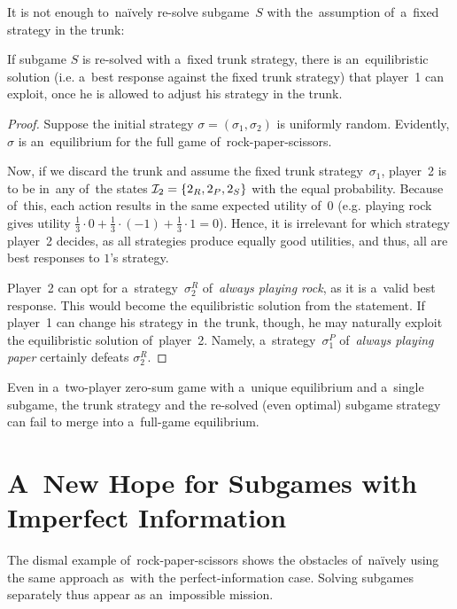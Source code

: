 It is not enough to~na{\"i}vely re-solve subgame~$S$ with the~assumption of~a~fixed strategy in the trunk:
\begin{claim}
  \label{claim:rps-subgame}
  If subgame $S$ is re-solved with a~fixed trunk strategy, there is an~equilibristic solution (i.e. a~best response against the fixed trunk strategy) that player~1 can exploit, once he is allowed to adjust his strategy in the trunk.
\end{claim}
\begin{proof}
  Suppose the initial strategy $\sigma = (\sigma_1, \sigma_2)$ is uniformly random\footnotemark{}.
  Evidently, $\sigma$ is an~equilibrium for the full game of~rock-paper-scissors.

  Now, if we discard the trunk and assume the fixed trunk strategy~$\sigma_1$, player~2 is to be in~any of~the states $\mathcal{I}_2 = \{2_R, 2_P, 2_S\}$ with the equal probability.
  Because of~this, each action results in the same expected utility of~$0$ (e.g. playing rock gives utility $\frac{1}{3} \cdot 0 + \frac{1}{3} \cdot (-1) + \frac{1}{3} \cdot 1 = 0$).
  Hence, it is irrelevant for which strategy player~2 decides, as all strategies produce equally good utilities, and thus, all are best responses to $1$'s strategy\footnotemark.

  Player~2 can opt for a~strategy~$\sigma^R_2$ of~\emph{always playing rock}, as it is a~valid best response.
  This would become the equilibristic solution from the statement.
  If player~1 can change his strategy in~the trunk, though, he may naturally exploit the equilibristic solution of~player~2.
  Namely, a~strategy~$\sigma^P_1$ of~\emph{always playing paper} certainly defeats $\sigma^R_2$.
\end{proof}

\begin{cor}
  Even in a~two-player zero-sum game with a~unique equilibrium and a~single subgame, the trunk strategy and the re-solved (even optimal) subgame strategy can fail to merge into a~full-game equilibrium.
\end{cor}

\section{A~New Hope for Subgames with Imperfect Information}
The dismal example of~rock-paper-scissors shows the obstacles of~na{\"i}vely using the same approach as~with the perfect-information case.
Solving subgames separately thus appear as an~impossible mission. 

